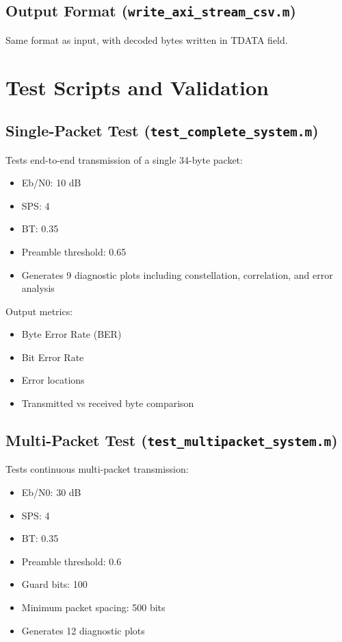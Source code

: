 \documentclass[12pt]{article}
\begin{document}
\subsection{Output Format (\texttt{write\_axi\_stream\_csv.m})}
Same format as input, with decoded bytes written in TDATA field.

\section{Test Scripts and Validation}

\subsection{Single-Packet Test (\texttt{test\_complete\_system.m})}
Tests end-to-end transmission of a single 34-byte packet:
\begin{itemize}
    \item Eb/N0: 10 dB
    \item SPS: 4
    \item BT: 0.35
    \item Preamble threshold: 0.65
    \item Generates 9 diagnostic plots including constellation, correlation, and error analysis
\end{itemize}

Output metrics:
\begin{itemize}
    \item Byte Error Rate (BER)
    \item Bit Error Rate
    \item Error locations
    \item Transmitted vs received byte comparison
\end{itemize}

\subsection{Multi-Packet Test (\texttt{test\_multipacket\_system.m})}
Tests continuous multi-packet transmission:
\begin{itemize}
    \item Eb/N0: 30 dB
    \item SPS: 4
    \item BT: 0.35
    \item Preamble threshold: 0.6
    \item Guard bits: 100
    \item Minimum packet spacing: 500 bits
    \item Generates 12 diagnostic plots
\end{itemize}
\end{document}
